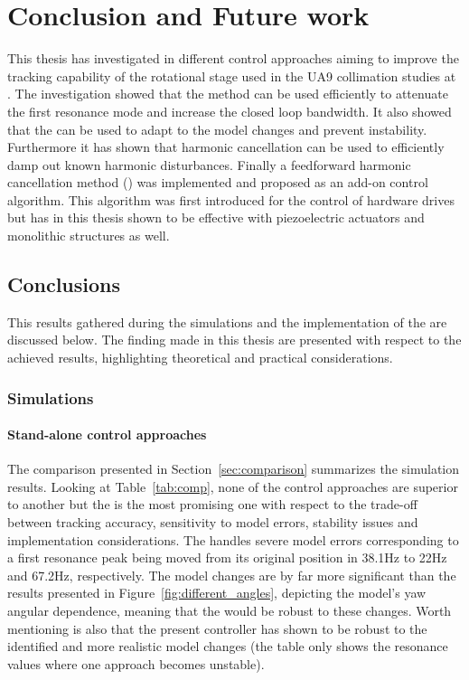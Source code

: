 \chapter{Conclusion and Future work}\label{cha:conclusion}
This thesis has investigated in different control approaches aiming to improve the tracking capability of the rotational stage used in the UA9 collimation studies at \abbrCERN. The investigation showed that the \abbrIRC method can be used efficiently to attenuate the first resonance mode and increase the closed loop bandwidth. It also showed that the \abbrMRACPE can be used to adapt to the model changes and prevent instability. Furthermore it has shown that harmonic cancellation can be used to efficiently damp out known harmonic disturbances. Finally a feedforward harmonic cancellation method (\abbrRFDC) was implemented and proposed as an add-on control algorithm. This algorithm was first introduced for the control of hardware drives but has in this thesis shown to be effective with piezoelectric actuators and monolithic structures as well.

\section{Conclusions}
This results gathered during the simulations and the implementation of the \abbrRFDC are discussed below. The finding made in this thesis are presented with respect to the achieved results, highlighting theoretical and practical considerations.

\subsection{Simulations}
\subsubsection{Stand-alone control approaches}
The comparison presented in Section~\ref{sec:comparison} summarizes the simulation results. Looking at Table~\ref{tab:comp}, none of the control approaches are superior to another but the \abbrIRC is the most promising one with respect to the trade-off between tracking accuracy, sensitivity to model errors, stability issues and implementation considerations. The \abbrIRC handles severe model errors corresponding to a first resonance peak being moved from its original position in 38.1Hz to 22Hz and 67.2Hz, respectively. The model changes are by far more significant than the results presented in Figure~\ref{fig:different_angles}, depicting the model's yaw angular dependence, meaning that the \abbrIRC would be robust to these changes. Worth mentioning is also that the present controller has shown to be robust to the identified and more realistic model changes (the table only shows the resonance values where one approach becomes unstable).

